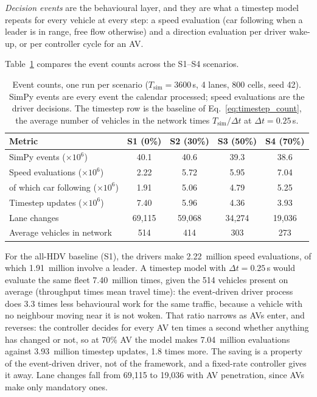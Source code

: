 \documentclass[review,authoryear]{elsarticle}
\begin{document}
\emph{Decision events} are the behavioural layer, and they are what a timestep model repeats for every vehicle at every step: a speed evaluation (car following when a leader is in range, free flow otherwise) and a direction evaluation per driver wake-up, or per controller cycle for an AV.

Table~\ref{tab:computational} compares the event counts across the S1--S4 scenarios.

\begin{table}[ht]
\centering
\caption{Event counts, one run per scenario ($T_{\text{sim}} = 3600$\,s, 4 lanes, 800 cells, seed 42). SimPy events are every event the calendar processed; speed evaluations are the driver decisions. The timestep row is the baseline of Eq.~\eqref{eq:timestep_count}, the average number of vehicles in the network times $T_{\text{sim}} / \Delta t$ at $\Delta t = 0.25$\,s.}
\label{tab:computational}
\begin{tabular}{@{}lcccc@{}}
\toprule
Metric & S1 (0\%) & S2 (30\%) & S3 (50\%) & S4 (70\%) \\
\midrule
SimPy events ($\times 10^6$) & 40.1 & 40.6 & 39.3 & 38.6 \\
Speed evaluations ($\times 10^6$) & 2.22 & 5.72 & 5.95 & 7.04 \\
of which car following ($\times 10^6$) & 1.91 & 5.06 & 4.79 & 5.25 \\
Timestep updates ($\times 10^6$) & 7.40 & 5.96 & 4.36 & 3.93 \\
Lane changes & 69{,}115 & 59{,}068 & 34{,}274 & 19{,}036 \\
Average vehicles in network & 514 & 414 & 303 & 273 \\
\bottomrule
\end{tabular}
\end{table}

For the all-HDV baseline (S1), the drivers make 2.22~million speed evaluations, of which 1.91~million involve a leader. A timestep model with $\Delta t = 0.25$\,s would evaluate the same fleet 7.40~million times, given the 514 vehicles present on average (throughput times mean travel time): the event-driven driver process does 3.3 times less behavioural work for the same traffic, because a vehicle with no neighbour moving near it is not woken. That ratio narrows as AVs enter, and reverses: the controller decides for every AV ten times a second whether anything has changed or not, so at 70\% AV the model makes 7.04~million evaluations against 3.93~million timestep updates, 1.8 times more. The saving is a property of the event-driven driver, not of the framework, and a fixed-rate controller gives it away. Lane changes fall from 69{,}115 to 19{,}036 with AV penetration, since AVs make only mandatory ones.
\end{document}
